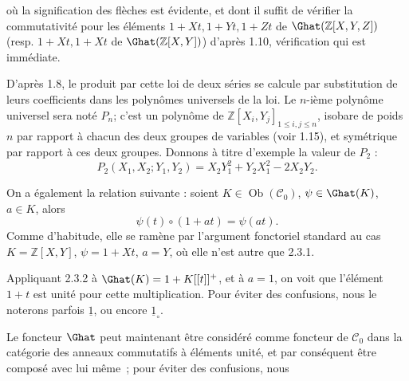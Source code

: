 où la
signification des flèches est évidente, et dont il suffit de vérifier la commutativité pour les éléments \(1+Xt,1+Yt,1+Zt\) de \(\Ghat(\mathbb Z[X,Y,Z])\) (resp. \(1+Xt,1+Xt\) de \(\Ghat(\mathbb Z[X,Y])\)) d'après 1.10, vérification qui est immédiate.

D'après 1.8, le produit par cette loi de deux séries se calcule par substitution de leurs coefficients dans les polynômes universels de la loi. Le \(n\)-ième polynôme universel sera noté \(P_n\); c'est un polynôme de \(\mathbb Z[X_i,Y_j]_{1\leq i,j\leq n}\), isobare de poids \(n\) par rapport à chacun des deux groupes de variables (voir 1.15), et symétrique par rapport à ces deux groupes. Donnons à titre d'exemple la valeur de \(P_2\) :
\[
  P_2(X_1,X_2;Y_1,Y_2)=X_2Y_1^2+Y_2X_1^2-2X_2Y_2.
\]

On a également la relation suivante : soient \(K\in\operatorname{Ob}(\mathcal C_0)\), \(\psi\in\Ghat(K)\), \(a\in K\), alors
\begin{equation}\tag{2.3.2}
  \psi(t)\circ(1+at)=\psi(at).
\end{equation}
Comme d'habitude, elle se ramène par l'argument fonctoriel standard au cas \(K=\mathbb Z[X,Y]\), \(\psi=1+Xt\), \(a=Y\), où elle n'est autre que 2.3.1.

Appliquant 2.3.2 à \(\Ghat(K)=1+K[[t]]^+\), et à \(a=1\), on voit que l'élément \(1+t\) est unité pour cette multiplication. Pour éviter des confusions, nous le noterons parfois \(\underline{1}\), ou encore \(\underline{1}_\circ\).

Le foncteur \(\Ghat\) peut maintenant être considéré comme foncteur de \(\mathcal C_0\) dans la catégorie des anneaux commutatifs à éléments unité, et par conséquent être composé avec lui même~; pour éviter des confusions,
nous 
